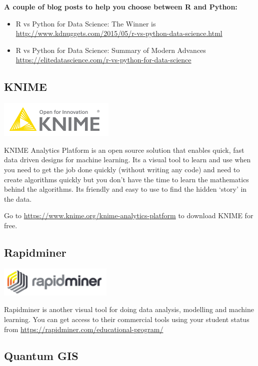 \documentclass[]{book}
\providecommand{\tightlist}{%
  \setlength{\itemsep}{0pt}\setlength{\parskip}{0pt}}
\theoremstyle{definition}
\theoremstyle{definition}
\theoremstyle{remark}
\begin{document}
\textbf{A couple of blog posts to help you choose between R and Python:}

\begin{itemize}
\tightlist
\item
  R vs Python for Data Science: The Winner is
  \url{http://www.kdnuggets.com/2015/05/r-vs-python-data-science.html}
\item
  R vs Python for Data Science: Summary of Modern Advances
  \url{https://elitedatascience.com/r-vs-python-for-data-science}
\end{itemize}

\subsection{KNIME}\label{knime}

\includegraphics[width=0.3\linewidth]{images/KNIMElogo}

KNIME Analytics Platform is an open source solution that enables quick,
fast data driven designs for machine learning. Its a visual tool to
learn and use when you need to get the job done quickly (without writing
any code) and need to create algorithms quickly but you don't have the
time to learn the mathematics behind the algorithms. Its friendly and
easy to use to find the hidden `story' in the data.

Go to \url{https://www.knime.org/knime-analytics-platform} to download
KNIME for free.

\subsection{Rapidminer}\label{rapidminer}

\includegraphics[width=0.3\linewidth]{images/Rapidminerlogo}

Rapidminer is another visual tool for doing data analysis, modelling and
machine learning. You can get access to their commercial tools using
your student status from
\url{https://rapidminer.com/educational-program/}

\subsection{Quantum GIS}\label{quantum-gis}
\end{document}
